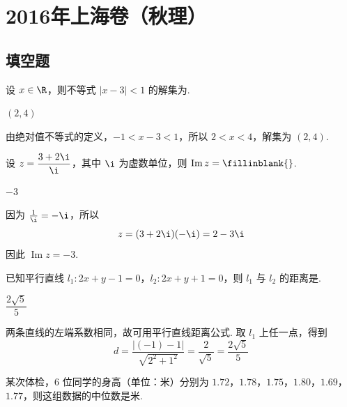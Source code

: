 \chapter{2016年上海卷（秋理）}

\section{填空题}

\begin{problem}
设 \(x\in\R\)，则不等式 \(|x-3|<1\) 的解集为\fillinblank{}.
\end{problem}

\begin{answer}
\((2,4)\)
\end{answer}

\begin{solution}
由绝对值不等式的定义，\(-1<x-3<1\)，所以 \(2<x<4\)，解集为 \((2,4)\).
\end{solution}

\begin{problem}
设 \(z=\dfrac{3+2\i}{\i}\)，其中 \(\i\) 为虚数单位，则 \(\operatorname{Im}z=\fillinblank{}\).
\end{problem}

\begin{answer}
\(-3\)
\end{answer}

\begin{solution}
因为 \(\frac{1}{\i}=-\i\)，所以
\[
z=(3+2\i)(-\i)=2-3\i
\]
因此 \(\operatorname{Im}z=-3\).
\end{solution}

\begin{problem}
已知平行直线 \(l_1:2x+y-1=0\)，\(l_2:2x+y+1=0\)，则 \(l_1\) 与 \(l_2\) 的距离是\fillinblank{}.
\end{problem}

\begin{answer}
\(\dfrac{2\sqrt5}{5}\)
\end{answer}

\begin{solution}
两条直线的左端系数相同，故可用平行直线距离公式. 取 \(l_1\) 上任一点，得到
\[
d=\frac{|(-1)-1|}{\sqrt{2^2+1^2}}=\frac{2}{\sqrt5}=\frac{2\sqrt5}{5}
\]
\end{solution}

\begin{problem}
某次体检，\(6\) 位同学的身高（单位：米）分别为 \(1.72\)，\(1.78\)，\(1.75\)，\(1.80\)，\(1.69\)，\(1.77\)，则这组数据的中位数是\fillinblank{}\(\text{米}\).
\end{problem}

